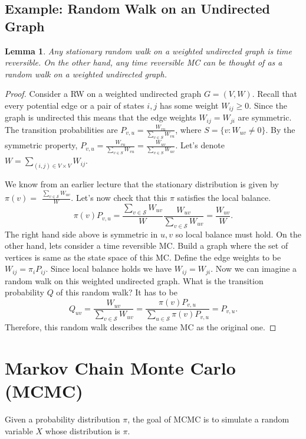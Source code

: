 \documentclass[11pt,a4paper]{article}
\newtheorem{lemma}{Lemma}
\begin{document}
\subsection{Example: Random Walk on an Undirected Graph}
\begin{lemma}
    Any stationary random walk on a weighted undirected graph is time reversible. On the other hand, any time reversible MC can be thought of as a random walk on a weighted undirected graph.
\end{lemma}
\begin{proof}
    Consider a RW on a weighted undirected graph $G=(V, W)$. Recall that every potential edge or a pair of states $i, j$ has some weight $W_{i j} \geq 0$. Since the graph is undirected this means that the edge weights $W_{i j}=W_{j i}$ are symmetric. The transition probabilities are $P_{v,u}=\frac{W_{vu}}{\sum_{v\in S} W_{vu}}$, where $S=\{v: W_{uv}\neq 0\}$. By the symmetric property, $P_{v,u}=\frac{W_{vu}}{\sum_{v\in S} W_{vu}}=\frac{W_{uv}}{\sum_{v\in S} W_{uv}}$. Let's denote $W=\sum_{(i, j) \in V \times V} W_{i j}$.

    We know from an earlier lecture that the stationary distribution is given by $\pi(v)=$ $\frac{\sum_{v \in \mathcal{S}} W_{u v}}{W}$. Let's now check that this $\pi$ satisfies the local balance.
    $$
    \pi(v) P_{v, u}=\frac{\sum_{v \in \mathcal{S}} W_{u v}}{W} \frac{W_{u v}}{\sum_{v \in \mathcal{S}} W_{u v}}=\frac{W_{u v}}{W} .
    $$
    The right hand side above is symmetric in $u, v$ so local balance must hold.
    On the other hand, lets consider a time reversible MC. Build a graph where the set of vertices is same as the state space of this MC. Define the edge weights to be $W_{i j}=\pi_i P_{i j}$. Since local balance holds we have $W_{i j}=W_{j i}$. Now we can imagine a random walk on this weighted undirected graph. What is the transition probability $Q$ of this random walk? It has to be
    $$
    Q_{u v}=\frac{W_{u v}}{\sum_{v \in \mathcal{S}} W_{u v}}=\frac{\pi(v) P_{v, u}}{\sum_{u \in \mathcal{S}} \pi(v) P_{v, u}}=P_{v, u} .
    $$
    Therefore, this random walk describes the same $\mathrm{MC}$ as the original one.

\end{proof}





\section{Markov Chain Monte Carlo (MCMC)}
Given a probability distribution $\pi$, the goal of MCMC is to simulate a random variable $X$ whose distribution is $\pi$.
\end{document}
